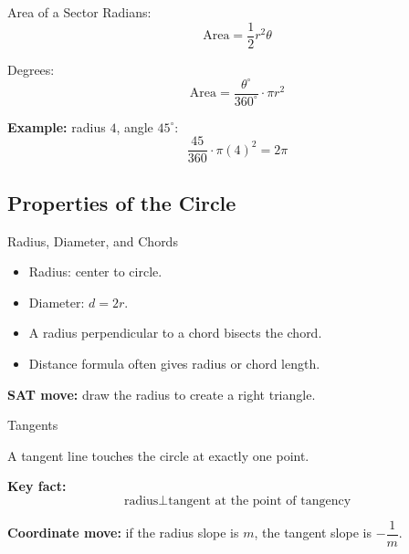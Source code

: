 \documentclass{beamer}
\begin{document}
\begin{frame}{Area of a Sector}
Radians:
\[
\text{Area}=\dfrac{1}{2}r^2\theta
\]

Degrees:
\[
\text{Area}=\dfrac{\theta^\circ}{360^\circ}\cdot \pi r^2
\]

\vspace{0.2cm}
\textbf{Example:} radius $4$, angle $45^\circ$:
\[
\dfrac{45}{360}\cdot\pi(4)^2=2\pi
\]
\end{frame}

\begin{frame}
\section{Properties of the Circle}
\end{frame}


\begin{frame}{Radius, Diameter, and Chords}

\begin{itemize}
    \item Radius: center to circle.
    \item Diameter: $d=2r$.
    \item A radius perpendicular to a chord bisects the chord.
    \item Distance formula often gives radius or chord length.
\end{itemize}

\vspace{0.2cm}
\textbf{SAT move:} draw the radius to create a right triangle.

\end{frame}

\begin{frame}{Tangents}

A tangent line touches the circle at exactly one point.

\vspace{0.2cm}
\textbf{Key fact:}
\[
\text{radius} \perp \text{tangent at the point of tangency}
\]

\vspace{0.2cm}
\textbf{Coordinate move:} if the radius slope is $m$, the tangent slope is $-\dfrac{1}{m}$.

\end{frame}
\end{document}
